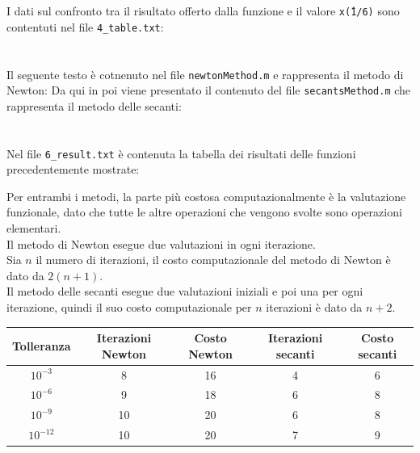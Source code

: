 \documentclass[10pt,a4paper]{article}
\begin{document}



\pagebreak
I dati sul confronto tra il  risultato offerto dalla funzione e il valore \texttt{x\^ (1/6)} sono contentuti nel file \texttt{4\_table.txt}:

\section{}
Il seguente testo è cotnenuto nel file \texttt{newtonMethod.m} e rappresenta il metodo di Newton:
Da qui in poi viene presentato il contenuto del file \texttt{secantsMethod.m} che rappresenta il metodo delle secanti:\\


\section{}
Nel file \texttt{6\_result.txt} è contenuta la tabella dei risultati delle funzioni precedentemente mostrate:

Per entrambi i metodi, la parte più costosa computazionalmente è la valutazione funzionale, dato che tutte le altre operazioni che vengono svolte sono operazioni elementari.\\
Il metodo di Newton esegue due valutazioni in ogni iterazione.\\
Sia $n$ il numero di iterazioni, il costo computazionale del metodo di Newton è dato da $2(n+1)$.\\
Il metodo delle secanti esegue due valutazioni iniziali e poi una per ogni iterazione, quindi il suo costo computazionale per $n$ iterazioni è dato da $n+2$.
\begin{center}
\begin{tabular}{|c c c c c|} 
 \hline
 Tolleranza & Iterazioni Newton & Costo Newton & Iterazioni secanti & Costo secanti\\ [0.5ex] 
 \hline
 $10^{-3}$ & 8 & 16 & 4 & 6 \\ 
 \hline
 $10^{-6}$ & 9 & 18 & 6 & 8 \\
 \hline
 $10^{-9}$ & 10 & 20 & 6 & 8 \\
 \hline
 $10^{-12}$ & 10 & 20 & 7 & 9 \\
 \hline
\end{tabular}
\end{center}
\pagebreak
\end{document}
